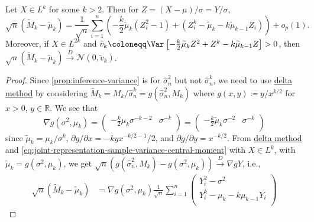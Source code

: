 \begin{theorem}\label{thm:asymptotic-distribution-sample-standardized-central-moment}
	Let \(X \in L^{k}\) for some \(k > 2\). Then for \(Z = (X - \mu ) / \sigma = Y / \sigma \),
	\[
		\sqrt{n} (\widetilde{M} _k - \widetilde{\mu} _k)
		= \frac{1}{\sqrt{n} } \sum_{i=1}^{n} \left( -\frac{k}{2} \widetilde{\mu} _k (Z_i^2 - 1) + (Z_i^k - \widetilde{\mu} _k - k \widetilde{\mu} _{k-1} Z_i ) \right) + o_p(1).
	\]
	Moreover, if \(X \in L^{2k}\) and \(\widetilde{v} _k \coloneqq \Var_{}\left[- \frac{k}{2} \widetilde{\mu} _k Z^2 + Z^k - k \widetilde{\mu} _{k-1} Z \right] > 0\), then \(\sqrt{n} (\widetilde{M} _k - \widetilde{\mu} _k) \overset{D}{\to} \mathcal{N} (0, \widetilde{v} _k)\).
\end{theorem}
\begin{proof}
	Since \autoref{prop:inference-variance} is for \(\hat{\sigma} _n^2\) but not \(\hat{\sigma} _n^k\), we need to use \hyperref[thm:delta-method]{delta method} by considering \(\widetilde{M} _k = M_k / \hat{\sigma} _n^k = g(\hat{\sigma} _n^2, M_k)\) where \(g(x, y) \coloneqq y / x^{k / 2}\) for \(x > 0\), \(y \in \mathbb{R} \). We see that
	\[
		\nabla g(\sigma ^2, \mu _k)
		= \begin{pmatrix}
			-\frac{k}{2} \mu _k \sigma ^{-k - 2} & \sigma ^{-k} \\
		\end{pmatrix}
		= \begin{pmatrix}
			-\frac{k}{2} \widetilde{\mu} _k \sigma ^{-2} & \sigma ^{-k} \\
		\end{pmatrix}
	\]
	since \(\widetilde{\mu} _k = \mu _k / \sigma ^k\), \(\partial g / \partial x = - k y x^{-k / 2 - 1} / 2\), and  \(\partial g / \partial y = x^{-k / 2}\). From \hyperref[thm:delta-method]{delta method} and \autoref{eq:joint-representation-sample-variance-central-moment} with \(X \in L^k\), with \(\widetilde{\mu} _k = g(\sigma ^2, \mu _k)\), we get \(\sqrt{n} (g(\hat{\sigma} _n^2, M_k) - g(\sigma ^2, \mu _k)) \overset{D}{\to } \nabla g Y\), i.e.,
	\[
		\begin{split}
			\sqrt{n} (\widetilde{M} _k - \widetilde{\mu} _k)
			 & = \nabla g(\sigma ^2, \mu _k) \frac{1}{\sqrt{n} } \sum_{i=1}^{n} \begin{pmatrix}
				                                                                    Y_i^2 - \sigma ^2                 \\
				                                                                    Y_i^k - \mu _k - k \mu _{k-1} Y_i \\

\end{pmatrix}
\end{split}\]
\end{proof}
